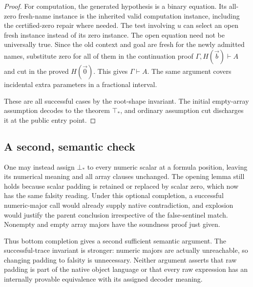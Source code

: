 \documentclass[11pt,letterpaper]{article}
\theoremstyle{definition}\newtheorem{definition}[theorem]{Definition}
\theoremstyle{remark}\newtheorem{remark}[theorem]{Remark}
\begin{document}
\begin{proof}
For computation, the generated hypothesis is a binary equation.  Its
all-zero fresh-name instance is the inherited valid computation instance,
including the certified-zero repair where needed.  The test involving
$u$ can select an open fresh instance instead of its zero instance.
The open equation need not be universally true.  Since the old context
and goal are fresh for the newly admitted names, substitute zero for all
of them in the continuation proof $\Gamma,H(\vec b)\vdash A$ and cut
in the proved $H(\vec0)$.  This gives $\Gamma\vdash A$.  The same
argument covers incidental extra parameters in a fractional interval.

These are all successful cases by the root-shape invariant.  The initial
empty-array assumption decodes to the theorem $\top_*$, and ordinary
assumption cut discharges it at the public entry point.
\end{proof}

\subsection{A second, semantic check}

One may instead assign $\bot_*$ to every numeric scalar at a formula
position, leaving its numerical meaning and all array clauses unchanged.
The opening lemma still holds because scalar padding is retained or
replaced by scalar zero, which now has the same falsity reading.  Under
this optional completion, a successful numeric-major call would already
supply native contradiction, and explosion would justify the parent
conclusion irrespective of the false-sentinel match.  Nonempty and empty
array majors have the soundness proof just given.

Thus bottom completion gives a second sufficient semantic argument.
The successful-trace invariant is stronger: numeric majors are actually
unreachable, so changing padding to falsity is unnecessary.  Neither
argument asserts that raw padding is part of the native object language
or that every raw expression has an internally provable equivalence with
its assigned decoder meaning.
\end{document}
